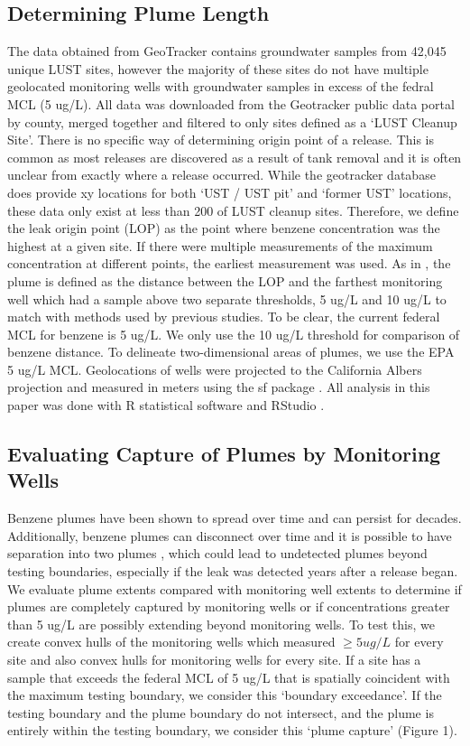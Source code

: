 \documentclass[draft,linenumbers]{agujournal2018}
\begin{document}
\subsection{Determining Plume Length}

The data obtained from GeoTracker contains groundwater samples from
42,045 unique LUST sites, however the majority of these sites do not
have multiple geolocated monitoring wells with groundwater samples in
excess of the fedral MCL (5 ug/L). All data was downloaded from the
Geotracker public data portal \citep{geotracker} by county, merged
together and filtered to only sites defined as a `LUST Cleanup Site'.
There is no specific way of determining origin point of a release. This
is common as most releases are discovered as a result of tank removal
and it is often unclear from exactly where a release occurred. While the
geotracker database does provide xy locations for both `UST / UST pit'
and `former UST' locations, these data only exist at less than 200 of
LUST cleanup sites. Therefore, we define the leak origin point (LOP) as
the point where benzene concentration was the highest at a given site.
If there were multiple measurements of the maximum concentration at
different points, the earliest measurement was used. As in
\citet{connor2015}, the plume is defined as the distance between the LOP
and the farthest monitoring well which had a sample above two separate
thresholds, 5 ug/L and 10 ug/L to match with methods used by previous
studies. To be clear, the current federal MCL for benzene is 5 ug/L. We
only use the 10 ug/L threshold for comparison of benzene distance. To
delineate two-dimensional areas of plumes, we use the EPA 5 ug/L MCL.
Geolocations of wells were projected to the California Albers projection
and measured in meters using the sf package \citep{sf}. All analysis in
this paper was done with R statistical software \citep{R} and RStudio
\citep{RStudio}.

\subsection{Evaluating Capture of Plumes by Monitoring Wells}

Benzene plumes have been shown to spread over time and can persist for
decades. Additionally, benzene plumes can disconnect over time and it is
possible to have separation into two plumes \citep{molson2002modeling},
which could lead to undetected plumes beyond testing boundaries,
especially if the leak was detected years after a release began. We
evaluate plume extents compared with monitoring well extents to
determine if plumes are completely captured by monitoring wells or if
concentrations greater than 5 ug/L are possibly extending beyond
monitoring wells. To test this, we create convex hulls \citep{sf} of the
monitoring wells which measured \(\ge 5 ug/L\) for every site and also
convex hulls for monitoring wells for every site. If a site has a sample
that exceeds the federal MCL of 5 ug/L that is spatially coincident with
the maximum testing boundary, we consider this `boundary exceedance'. If
the testing boundary and the plume boundary do not intersect, and the
plume is entirely within the testing boundary, we consider this `plume
capture' (Figure 1).
\end{document}
